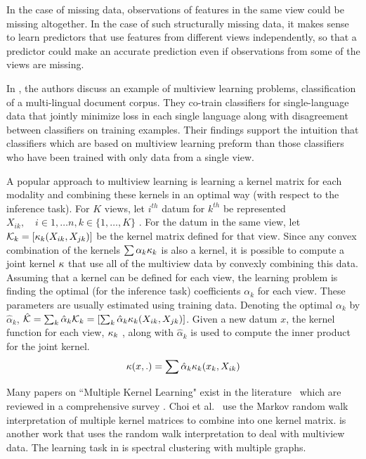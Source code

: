 \documentclass[12pt,oneside,final]{thesis}\usepackage[]{graphicx}\usepackage[]{color}
\begin{document}
In the case of missing data, observations of features in the same view could  be missing altogether. In the case of such structurally missing data, it makes sense to learn predictors that use features from different views independently, so that a predictor could make an accurate prediction even if observations from some of the views are missing.


In  \cite{Amini2009}, the authors  discuss  an example of multiview learning problems, classification of a multi-lingual document corpus. They  co-train  classifiers for single-language data that jointly minimize  loss in each single language along with disagreement between classifiers on training examples. Their findings support the intuition that  classifiers which are based on multiview learning preform than those classifiers who have been trained with only data from a single view.


A popular approach to multiview learning is learning a  kernel matrix for each modality and combining these kernels in an optimal way (with respect to the inference task). For $K$ views, let $i^{th}$ datum for $k^{th}$ be represented $X_{ik},\quad i \in {1,\ldots n}, k \in \{ 1,\ldots, K \}$ . For the datum in the same view, let ${\mathcal{K}}_{k} = \left[ \kappa_{k} (X_{ik},X_{jk}) \right] $ be the kernel matrix defined for that view.  Since any convex combination of the kernels $\sum{\alpha_k \kappa_{k} } $ is also a kernel, it is possible to compute a joint kernel $\kappa$ that use all of the multiview data by convexly combining this data. Assuming that a kernel can be defined for each view, the learning problem is  finding the optimal (for the inference task) coefficients $\alpha_k$ for each view. These parameters are usually estimated using training data. Denoting the optimal  $\alpha_k$ by  $\hat{\alpha}_k$,  $\hat{\mathcal{K}} = \sum_k{\hat{\alpha}_k \mathcal{K}_{k} }  =  \left[ \sum_k{\hat{\alpha}_k {\kappa_k} (X_{ik},X_{jk})} \right] $.  Given a new datum $x$, the kernel function for each view, $\kappa_{k}$ ,  along with $\hat{\alpha}_k$ is used to compute the inner product for the joint kernel. 
\[
{\kappa}(x,.)= \sum{\hat{\alpha}_k {\kappa_k} (x_{k},X_{ik})} 
\]

Many papers on ``Multiple Kernel Learning"   exist in the literature~\cite{McFee:2011:LMS:1953048.1953063,Lin2009,Lanckriet2004} which are reviewed in a comprehensive survey \cite{MKLSurvey}.
Choi et al.\ \cite{Choi:2008:MIM:1619995.1620064} use the Markov random walk interpretation of multiple kernel matrices to combine into one kernel matrix. \cite{ZhouBurges2007a} is another work that uses the random walk interpretation to deal with multiview data. The learning task in  \cite{ZhouBurges2007a} is spectral clustering with multiple graphs.
\end{document}
